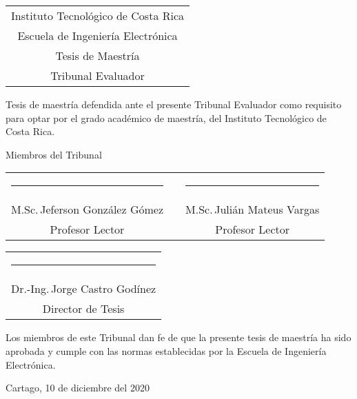 
\thispagestyle{empty}

\newcommand{\lectorI}{M.Sc.\,Jeferson González Gómez}
\newcommand{\lectorII}{M.Sc.\,Julián Mateus Vargas}
\newcommand{\director}{Dr.-Ing.\,Jorge Castro Godínez}


\begin{center}
  \begin{tabular}{c}
    Instituto Tecnológico de Costa Rica \\
    Escuela de Ingeniería Electrónica \\
    Tesis de Maestría \\
    Tribunal Evaluador
  \end{tabular}
\end{center}

\vfill

Tesis de maestría defendida ante el presente Tribunal Evaluador como
requisito para optar por el grado académico de maestría, del Instituto
Tecnológico de Costa Rica.

\vfill

\vspace*{20mm}
\begin{center}
 Miembros del Tribunal
\end{center}
\vspace*{8mm}

\vfill

\begin{center}
  \begin{tabular}{ccc}
    \rule{70mm}{0.5pt} & \rule{15mm}{0pt} & \rule{70mm}{0.5pt} \\
    \lectorI && \lectorII \\
    Profesor Lector && Profesor Lector
  \end{tabular}
  
  \vspace{10mm}

  \begin{tabular}{c}
    \rule{6cm}{0.5pt} \\
    \director \\
    Director de Tesis
  \end{tabular}
\end{center}

\vfill


Los miembros de este Tribunal dan fe de que la presente tesis de maestría 
ha sido aprobada y cumple con las normas establecidas por la Escuela de
Ingeniería Electrónica.

\vfill

\begin{center}
  Cartago, 10 de diciembre del 2020\par
\end{center}

\cleardoublepage

